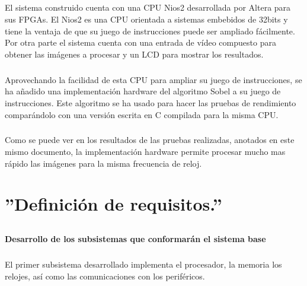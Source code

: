 \documentclass[a4paper,12pt,titlepage,final]{book}
\begin{document}
\paragraph{}
El sistema construido cuenta con una CPU Nios2 desarrollada por Altera para sus FPGAs. El Nios2 es una CPU orientada a sistemas embebidos de 32bits y tiene la ventaja de que su juego de instrucciones puede ser ampliado fácilmente. Por otra parte el sistema cuenta con una entrada de vídeo compuesto para obtener las imágenes a procesar y un LCD para mostrar los resultados.

\paragraph{}
Aprovechando la facilidad de esta CPU para ampliar su juego de instrucciones, se ha añadido una implementación hardware del algoritmo Sobel a su juego de instrucciones. Este algoritmo se ha usado para hacer las pruebas de rendimiento comparándolo con una versión escrita en C compilada para la misma CPU.

\paragraph{}
Como se puede ver en los resultados de las pruebas realizadas, anotados en este mismo documento, la implementación hardware permite procesar mucho mas rápido las imágenes para la misma frecuencia de reloj.

\chapter{''Definición de requisitos.''}

\section*{}
\subsection*{}

\subsubsection{Desarrollo de los subsistemas que conformarán el sistema base}

\paragraph{}
El primer subsistema desarrollado implementa el procesador, la memoria los relojes, así como las comunicaciones con los periféricos.
\end{document}
